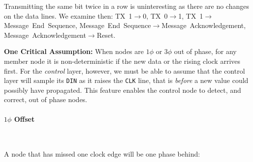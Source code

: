 Transmitting the same bit twice in a row is uninteresting as there are no
changes on the data lines. We examine then: TX~1$\rightarrow$0,
TX~0$\rightarrow$1, TX~1$\rightarrow$Message~End~Sequence,
Message~End~Sequence$\rightarrow$Message~Acknowledgement,
Message~Acknowledgement$\rightarrow$Reset.

\medskip
\noindent
\begin{framed}
  \label{reset-assumption}
  \textbf{One Critical Assumption:} When nodes are $1\phi$ or $3\phi$ out of
  phase, for any member node it is non-deterministic if the new data or the
  rising clock arrives first. For the {\em control} layer, however, we must
  be able to assume that the control layer will sample its {\tt DIN} as it
  raises the {\tt CLK} line, that is {\em before} a new value could possibly
  have propagated. This feature enables the control node to detect, and
  correct, out of phase nodes.
\end{framed}

\paragraph{$1\phi$ Offset}
~

A node that has missed one clock edge will be one phase behind:

